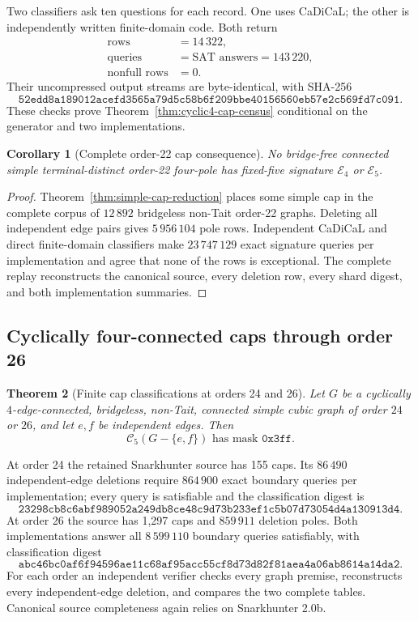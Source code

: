 \documentclass[11pt]{article}
\newtheorem{theorem}{Theorem}[section]
\newtheorem{corollary}[theorem]{Corollary}
\theoremstyle{definition}
\theoremstyle{remark}
\begin{document}
Two classifiers ask ten questions for each record.  One uses CaDiCaL;
the other is independently written finite-domain code.  Both return
\[
\begin{aligned}
 \text{rows}&=14\,322,\\
 \text{queries}&=\text{SAT answers}=143\,220,\\
 \text{nonfull rows}&=0.
\end{aligned}
\]
Their uncompressed output streams are byte-identical, with SHA-256
\[
\texttt{52edd8a189012acefd3565a79d5c58b6f209bbe40156560eb57e2c569fd7c091}.
\]
These checks prove Theorem~\ref{thm:cyclic4-cap-census} conditional on
the generator and two implementations.

\begin{corollary}[Complete order-22 cap consequence]
\label{cor:order22-all-cap}
No bridge-free connected simple terminal-distinct order-22 four-pole
has fixed-five signature \(\mathcal E_4\) or \(\mathcal E_5\).
\end{corollary}

\begin{proof}
Theorem~\ref{thm:simple-cap-reduction} places some simple cap in the
complete corpus of \(12\,892\) bridgeless non-Tait order-22 graphs.
Deleting all independent edge pairs gives \(5\,956\,104\) pole rows.
Independent CaDiCaL and direct finite-domain classifiers make
\(23\,747\,129\) exact signature queries per implementation and agree
that none of the rows is exceptional.  The complete replay
reconstructs the canonical source, every deletion row, every shard
digest, and both implementation summaries.
\end{proof}

\subsection{Cyclically four-connected caps through order 26}

\begin{theorem}[Finite cap classifications at orders 24 and 26]
\label{thm:cyclic4-through26}
Let \(G\) be a cyclically \(4\)-edge-connected, bridgeless, non-Tait,
connected simple cubic graph of order \(24\) or \(26\), and let \(e,f\)
be independent edges.  Then
\[
                         \mathcal C_5(G-\{e,f\})
                         \text{ has mask }\texttt{0x3ff}.
\]
\end{theorem}

At order 24 the retained Snarkhunter source has 155 caps.  Its
\(86\,490\) independent-edge deletions require \(864\,900\) exact
boundary queries per implementation; every query is satisfiable and
the classification digest is
\[
\texttt{23298cb8c6abf989052a249db8ce48c9d73b233ef1c5b07d73054d4a130913d4}.
\]
At order 26 the source has 1,297 caps and \(859\,911\) deletion poles.
Both implementations answer all \(8\,599\,110\) boundary queries
satisfiably, with classification digest
\[
\texttt{abc46bc0af6f94596ae11c68af95acc55cf8d73d82f81aea4a06ab8614a14da2}.
\]
For each order an independent verifier checks every graph premise,
reconstructs every independent-edge deletion, and compares the two
complete tables.  Canonical source completeness again relies on
Snarkhunter 2.0b.
\end{document}

